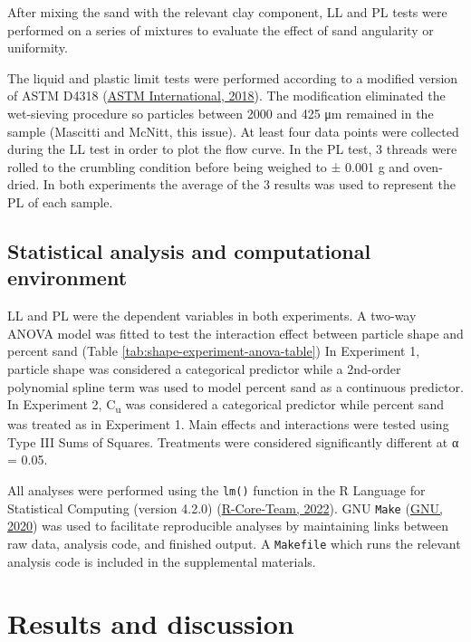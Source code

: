 \documentclass[
  letterpaper,
]{article}
\begin{document}
After mixing the sand with the relevant clay component, LL and PL tests were performed on a series of mixtures to evaluate the effect of sand angularity or uniformity.

The liquid and plastic limit tests were performed according to a modified version of ASTM D4318 (\protect\hyperlink{ref-ASTMD43182018}{ASTM International, 2018}).
The modification eliminated the wet-sieving procedure so particles between 2000 and 425 μm remained in the sample (Mascitti and McNitt, this issue).
At least four data points were collected during the LL test in order to plot the flow curve.
In the PL test, 3 threads were rolled to the crumbling condition before being weighed to ± 0.001 g and oven-dried.
In both experiments the average of the 3 results was used to represent the PL of each sample.

\hypertarget{statistical-analysis-and-computational-environment}{%
\subsection{Statistical analysis and computational environment}\label{statistical-analysis-and-computational-environment}}

LL and PL were the dependent variables in both experiments.
A two-way ANOVA model was fitted to test the interaction effect between particle shape and percent sand (Table \ref{tab:shape-experiment-anova-table})
In Experiment 1, particle shape was considered a categorical predictor while a 2nd-order polynomial spline term was used to model percent sand as a continuous predictor.
In Experiment 2, C\textsubscript{u} was considered a categorical predictor while percent sand was treated as in Experiment 1.
Main effects and interactions were tested using Type III Sums of Squares.
Treatments were considered significantly different at α = 0.05.

All analyses were performed using the \texttt{lm()} function in the R Language for Statistical Computing (version 4.2.0) (\protect\hyperlink{ref-R-Core-Team2022}{R-Core-Team, 2022}).
GNU \texttt{Make} (\protect\hyperlink{ref-GNU2020}{GNU, 2020}) was used to facilitate reproducible analyses by maintaining links between raw data, analysis code, and finished output.
A \texttt{Makefile} which runs the relevant analysis code is included in the supplemental materials.

\hypertarget{results-and-discussion}{%
\section{Results and discussion}\label{results-and-discussion}}
\end{document}
